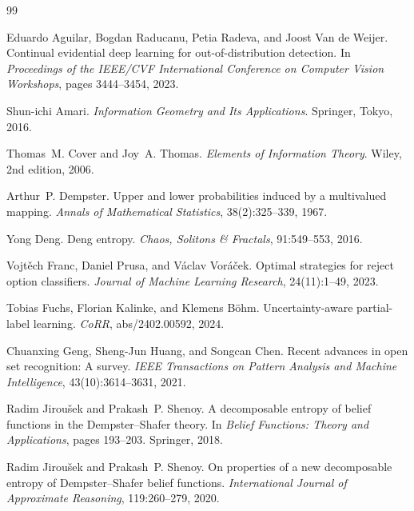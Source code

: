 \documentclass[11pt]{article}
\newcommand{\1}{\mathbf{1}}
\begin{document}
\begin{thebibliography}{99}

Eduardo Aguilar, Bogdan Raducanu, Petia Radeva, and Joost Van de Weijer.
\newblock Continual evidential deep learning for out-of-distribution detection.
\newblock In \emph{Proceedings of the IEEE/CVF International Conference on Computer Vision Workshops}, pages 3444--3454, 2023.

Shun-ichi Amari.
\newblock \emph{Information Geometry and Its Applications}.
\newblock Springer, Tokyo, 2016.

Thomas~M. Cover and Joy~A. Thomas.
\newblock \emph{Elements of Information Theory}.
\newblock Wiley, 2nd edition, 2006.

Arthur~P. Dempster.
\newblock Upper and lower probabilities induced by a multivalued mapping.
\newblock \emph{Annals of Mathematical Statistics}, 38(2):325--339, 1967.

Yong Deng.
\newblock Deng entropy.
\newblock \emph{Chaos, Solitons \& Fractals}, 91:549--553, 2016.

Vojt\v{e}ch Franc, Daniel Prusa, and V\'aclav Vor\'a\v{c}ek.
\newblock Optimal strategies for reject option classifiers.
\newblock \emph{Journal of Machine Learning Research}, 24(11):1--49, 2023.

Tobias Fuchs, Florian Kalinke, and Klemens B\"ohm.
\newblock Uncertainty-aware partial-label learning.
\newblock \emph{CoRR}, abs/2402.00592, 2024.

Chuanxing Geng, Sheng-Jun Huang, and Songcan Chen.
\newblock Recent advances in open set recognition: A survey.
\newblock \emph{IEEE Transactions on Pattern Analysis and Machine Intelligence}, 43(10):3614--3631, 2021.

Radim Jirou\v{s}ek and Prakash~P. Shenoy.
\newblock A decomposable entropy of belief functions in the {D}empster--{S}hafer theory.
\newblock In \emph{Belief Functions: Theory and Applications}, pages 193--203. Springer, 2018.

Radim Jirou\v{s}ek and Prakash~P. Shenoy.
\newblock On properties of a new decomposable entropy of {D}empster--{S}hafer belief functions.
\newblock \emph{International Journal of Approximate Reasoning}, 119:260--279, 2020.


\end{thebibliography}
\end{document}
